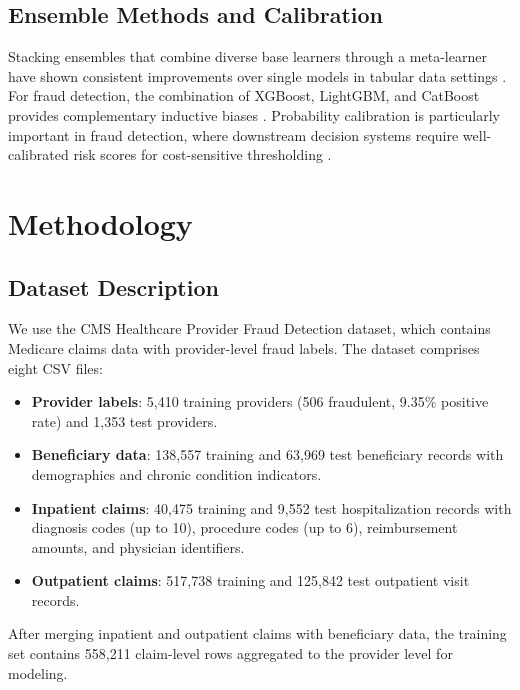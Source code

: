 \documentclass[conference]{IEEEtran}
\begin{document}
\subsection{Ensemble Methods and Calibration}

Stacking ensembles that combine diverse base learners through a meta-learner have shown consistent improvements over single models in tabular data settings \cite{wolpert1992}. For fraud detection, the combination of XGBoost, LightGBM, and CatBoost provides complementary inductive biases \cite{chen2016, ke2017, prokhorenkova2018}. Probability calibration is particularly important in fraud detection, where downstream decision systems require well-calibrated risk scores for cost-sensitive thresholding \cite{niculescu2005}.

\section{Methodology}
\label{sec:methodology}

\subsection{Dataset Description}

We use the CMS Healthcare Provider Fraud Detection dataset, which contains Medicare claims data with provider-level fraud labels. The dataset comprises eight CSV files:

\begin{itemize}[leftmargin=*]
    \item \textbf{Provider labels}: 5,410 training providers (506 fraudulent, 9.35\% positive rate) and 1,353 test providers.
    \item \textbf{Beneficiary data}: 138,557 training and 63,969 test beneficiary records with demographics and chronic condition indicators.
    \item \textbf{Inpatient claims}: 40,475 training and 9,552 test hospitalization records with diagnosis codes (up to 10), procedure codes (up to 6), reimbursement amounts, and physician identifiers.
    \item \textbf{Outpatient claims}: 517,738 training and 125,842 test outpatient visit records.
\end{itemize}

After merging inpatient and outpatient claims with beneficiary data, the training set contains 558,211 claim-level rows aggregated to the provider level for modeling.
\end{document}
